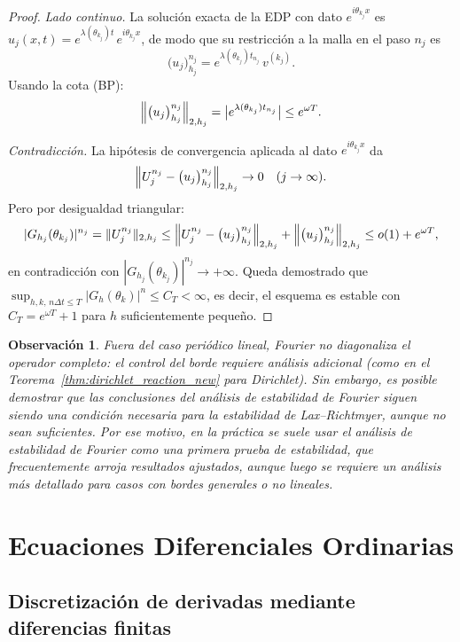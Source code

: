 \documentclass[a4paper,11pt]{report}
\newtheorem{remark}[theorem]{Observación}
\begin{document}
\begin{proof}
\noindent\emph{Lado continuo.} La solución exacta de la EDP con dato $e^{i\theta_{k_j}x}$ es $u_j(x,t)=e^{\lambda(\theta_{k_j})t}\,e^{i\theta_{k_j}x}$, de modo que su restricción a la malla en el paso $n_j$ es
\[
  \bigl(u_j\bigr)_{h_j}^{n_j}=e^{\lambda(\theta_{k_j})t_{n_j}}\,v^{(k_j)}.
\]
Usando la cota (BP):
\[
  \Bigl\|\bigl(u_j\bigr)_{h_j}^{n_j}\Bigr\|_{2,h_j}
  =\bigl|e^{\lambda(\theta_{k_j})t_{n_j}}\bigr|
  \le e^{\omega T}.
\]

\noindent\emph{Contradicción.} La hipótesis de convergencia aplicada al dato $e^{i\theta_{k_j}x}$ da
\[
  \Bigl\|U_j^{n_j}-\bigl(u_j\bigr)_{h_j}^{n_j}\Bigr\|_{2,h_j}\to 0
  \quad(j\to\infty).
\]
Pero por desigualdad triangular:
\[
  |G_{h_j}(\theta_{k_j})|^{n_j}
  =\|U_j^{n_j}\|_{2,h_j}
  \le\Bigl\|U_j^{n_j}-\bigl(u_j\bigr)_{h_j}^{n_j}\Bigr\|_{2,h_j}
    +\Bigl\|\bigl(u_j\bigr)_{h_j}^{n_j}\Bigr\|_{2,h_j}
  \le o(1)+e^{\omega T},
\]
en contradicción con $|G_{h_j}(\theta_{k_j})|^{n_j}\to+\infty$.  Queda demostrado que $\sup_{h,k,\,n\Delta t\le T}|G_h(\theta_k)|^n\le C_T<\infty$, es decir, el esquema es estable con $C_T=e^{\omega T}+1$ para $h$ suficientemente pequeño.
\end{proof}

\begin{remark}
Fuera del caso periódico lineal, Fourier no diagonaliza el operador completo: el control del borde requiere análisis adicional (como en el Teorema~\ref{thm:dirichlet_reaction_new} para Dirichlet). Sin embargo, es posible demostrar que las conclusiones del análisis de estabilidad de Fourier siguen siendo \textit{una condición necesaria} para la estabilidad de Lax--Richtmyer, aunque no sean suficientes. Por ese motivo, en la práctica se suele usar el análisis de estabilidad de Fourier como una primera prueba de estabilidad, que frecuentemente arroja resultados ajustados, aunque luego se requiere un análisis más detallado para casos con bordes generales o no lineales.
\end{remark}



\iffalse
\chapter{Ecuaciones Diferenciales Ordinarias}

\section{Discretización de derivadas mediante diferencias finitas}
\end{document}
